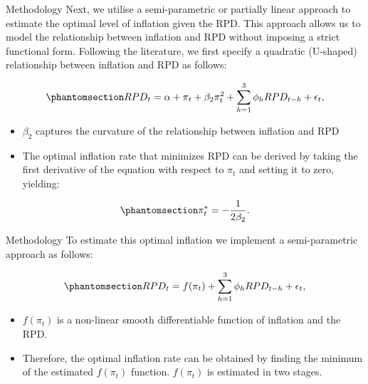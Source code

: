 \documentclass[
  ignorenonframetext,
]{beamer}
\providecommand{\tightlist}{%
  \setlength{\itemsep}{0pt}\setlength{\parskip}{0pt}}\usepackage{longtable,booktabs,array}
\begin{document}
\begin{frame}{Methodology}
\label{methodology-4}
Next, we utilise a semi-parametric or partially linear approach to
estimate the optimal level of inflation given the RPD. This approach
allows us to model the relationship between inflation and RPD without
imposing a strict functional form. Following the literature, we first
specify a quadratic (U-shaped) relationship between inflation and RPD as
follows:

\begin{equation}\phantomsection\label{eq-rpd_semi_parametric}{RPD_t = \alpha + \pi_t + \beta_2\pi_t^2 + \sum_{h=1}^{3}\phi_hRPD_{t-h} + \epsilon_t, }\end{equation}

\begin{itemize}
\tightlist
\item
  \(\beta_2\) captures the curvature of the relationship between
  inflation and RPD
\item
  The optimal inflation rate that minimizes RPD can be derived by taking
  the first derivative of the equation with respect to \(\pi_t\) and
  setting it to zero, yielding:
\end{itemize}

\begin{equation}\phantomsection\label{eq-optimal_inflation}{\pi_t^* = -\dfrac{1}{2\beta_2}.}\end{equation}
\end{frame}

\begin{frame}{Methodology}
\label{methodology-5}
To estimate this optimal inflation we implement a semi-parametric
approach as follows:

\begin{equation}\phantomsection\label{eq-rpd_semi_parametric_f}{RPD_t =  f(\pi_t) + \sum_{h=1}^{3}\phi_hRPD_{t-h} + \epsilon_t, }\end{equation}

\begin{itemize}
\tightlist
\item
  \(f(\pi_t)\) is a non-linear smooth differentiable function of
  inflation and the RPD.
\item
  Therefore, the optimal inflation rate can be obtained by finding the
  minimum of the estimated \(f(\pi_t)\) function. \(f(\pi_t)\) is
  estimated in two stages.
\end{itemize}
\end{frame}
\end{document}
